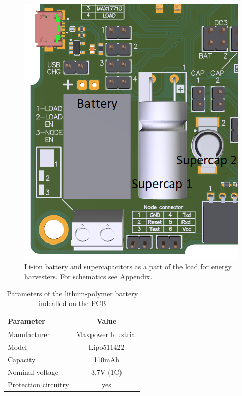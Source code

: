 \documentclass[12pt,a4paper]{article}
\begin{document}
\begin{figure}[ht!]
\includegraphics[scale=0.75]{batteryload.png}
\caption{Li-ion battery and supercapacitors as a part of the load for energy harvesters. For schematics see Appendix.}
\label{fig:batteryload}
\end{figure} 

\begin{table}[ht!]
\begin{tabular}{|l|c|}
\hline
\textbf{Parameter}              & \textbf{Value} \\ \hline
Manufacturer & Maxpower Idustrial          \\ \hline
Model                 & Lipo511422        \\ \hline
Capacity                & 110mAh         \\ \hline
Nominal voltage     & 3.7V (1C)            \\ \hline
Protection circuitry     & yes           \\ \hline
\end{tabular}
\caption{Parameters of the lithum-polymer battery indealled on the PCB \cite{battery_params} }
\label{tab:battery}
\end{table}
\end{document}
